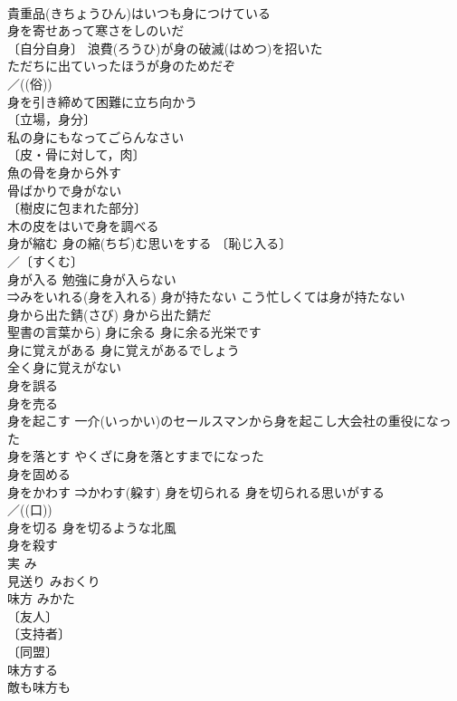 \documentclass[8pt]{extreport}
\begin{document}
\begin{CJK}{UTF8}{min}
\\	貴重品(きちょうひん)はいつも身につけている 
\\	身を寄せあって寒さをしのいだ 
\\	〔自分自身〕 浪費(ろうひ)が身の破滅(はめつ)を招いた 
\\	ただちに出ていったほうが身のためだぞ 
\\	／((俗)) 
\\	身を引き締めて困難に立ち向かう 
\\	〔立場，身分〕
\\	私の身にもなってごらんなさい 
\\	〔皮・骨に対して，肉〕
\\	魚の骨を身から外す 
\\	骨ばかりで身がない 
\\	〔樹皮に包まれた部分〕
\\	木の皮をはいで身を調べる 
\\	身が縮む 身の縮(ちぢ)む思いをする 〔恥じ入る〕
\\	／〔すくむ〕
\\	身が入る 勉強に身が入らない 
\\	⇒みをいれる(身を入れる) 身が持たない こう忙しくては身が持たない 
\\	身から出た錆(さび) 身から出た錆だ 
\\	聖書の言葉から) 身に余る 身に余る光栄です 
\\	身に覚えがある 身に覚えがあるでしょう 
\\	全く身に覚えがない 
\\	身を誤る 
\\	身を売る 
\\	身を起こす 一介(いっかい)のセールスマンから身を起こし大会社の重役になった 
\\	身を落とす やくざに身を落とすまでになった 
\\	身を固める 
\\	身をかわす ⇒かわす(躱す) 身を切られる 身を切られる思いがする 
\\	／((口)) 
\\	身を切る 身を切るような北風 
\\	身を殺す 
\\	実	み	
\\	見送り	みおくり	
\\	味方	みかた	
\\	〔友人〕
\\	〔支持者〕
\\	〔同盟〕
\\	味方する 
\\	敵も味方も 

\end{CJK}
\end{document}
